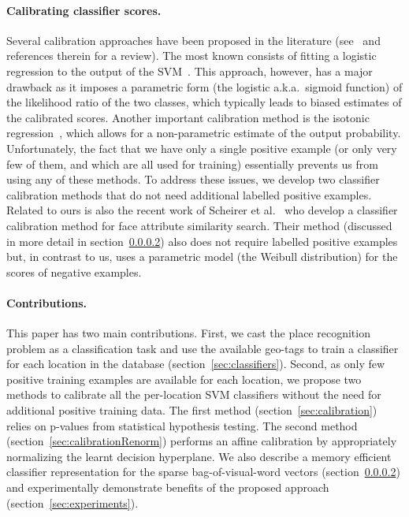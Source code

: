 \paragraph{Calibrating classifier scores.} 
 Several calibration approaches have been proposed in the literature (see~\cite{gebel2007calibrating} and references therein for a review). The most known consists of fitting a logistic regression to the output of the SVM~\cite{Platt99}.  This approach, however, has a major drawback as it imposes a parametric form (the logistic a.k.a.\ sigmoid function) of the likelihood ratio of the two classes, which typically leads to biased estimates of the calibrated scores. Another important calibration method is the isotonic regression~\cite{zadrozny2002transforming}, which allows for a non-parametric estimate of the output probability.
   Unfortunately, the fact that we have only a single positive example
   (or only very few of them, and which are all used for training)
    essentially prevents us from using any of these methods. 
To address these issues, we develop two classifier calibration methods that do not need additional labelled positive examples.
Related to ours is also the recent work of Scheirer et al.~\cite{Scheirer12} who develop a classifier calibration method for face attribute similarity search.
Their method (discussed in more detail in section~\ref{}) also does not require labelled positive examples but, in contrast to us, uses a parametric model (the Weibull distribution) for the scores of negative examples.    


\paragraph{Contributions.} 
This paper has two main contributions. First, we cast the place recognition problem as a classification task and use the available geo-tags to train a classifier for each location in the database (section~\ref{sec:classifiers}). Second, as only few positive training examples are available for each location, we propose two methods to calibrate all the per-location SVM classifiers without the need for additional positive training data. The first method (section~\ref{sec:calibration}) relies on p-values from statistical hypothesis testing. The second method (section~\ref{sec:calibrationRenorm}) performs an affine calibration by appropriately normalizing the learnt decision hyperplane. 
We also describe a memory efficient classifier representation for the sparse bag-of-visual-word vectors (section~\ref{}) and experimentally demonstrate benefits
of the proposed approach (section~\ref{sec:experiments}). 

